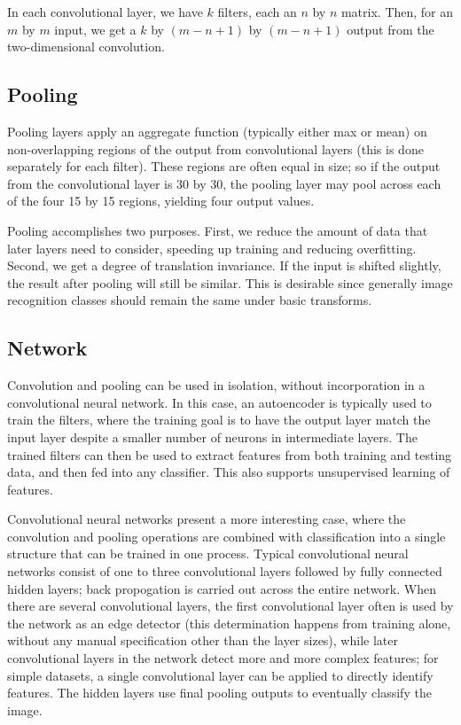 \documentclass[10pt,twocolumn]{article}
\begin{document}
In each convolutional layer, we have $k$ filters, each an $n$ by $n$ matrix. Then, for an $m$ by $m$ input, we get a $k$ by $(m - n + 1)$ by $(m - n + 1)$ output from the two-dimensional convolution.

\subsection{Pooling}

Pooling layers apply an aggregate function (typically either max or mean) on non-overlapping regions of the output from convolutional layers (this is done separately for each filter). These regions are often equal in size; so if the output from the convolutional layer is 30 by 30, the pooling layer may pool across each of the four 15 by 15 regions, yielding four output values.

Pooling accomplishes two purposes. First, we reduce the amount of data that later layers need to consider, speeding up training and reducing overfitting. Second, we get a degree of translation invariance. If the input is shifted slightly, the result after pooling will still be similar. This is desirable since generally image recognition classes should remain the same under basic transforms.

\subsection{Network}

Convolution and pooling can be used in isolation, without incorporation in a convolutional neural network. In this case, an autoencoder is typically used to train the filters, where the training goal is to have the output layer match the input layer despite a smaller number of neurons in intermediate layers. The trained filters can then be used to extract features from both training and testing data, and then fed into any classifier. This also supports unsupervised learning of features.

Convolutional neural networks present a more interesting case, where the convolution and pooling operations are combined with classification into a single structure that can be trained in one process. Typical convolutional neural networks consist of one to three convolutional layers followed by fully connected hidden layers; back propogation is carried out across the entire network. When there are several convolutional layers, the first convolutional layer often is used by the network as an edge detector (this determination happens from training alone, without any manual specification other than the layer sizes), while later convolutional layers in the network detect more and more complex features; for simple datasets, a single convolutional layer can be applied to directly identify features. The hidden layers use final pooling outputs to eventually classify the image.
\end{document}
